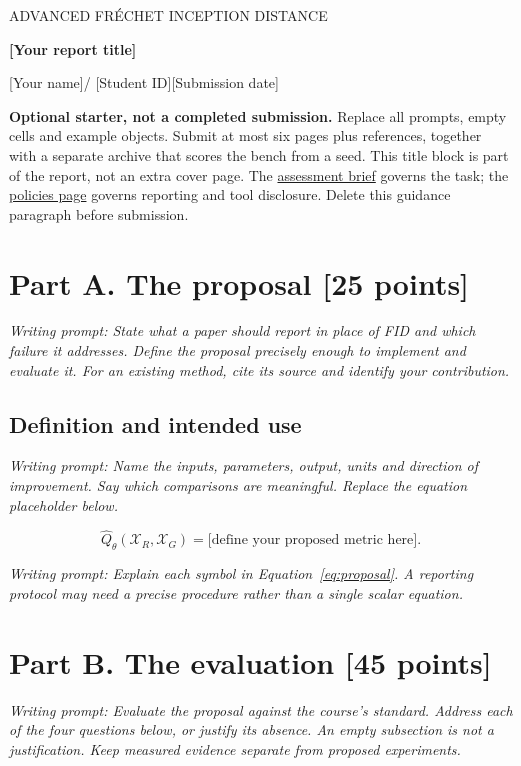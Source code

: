 \documentclass[11pt,a4paper]{article}
\newcommand{\reporttitle}{[Your report title]}
\newcommand{\studentname}{[Your name]}
\newcommand{\studentid}{[Student ID]}
\newcommand{\reportdate}{[Submission date]}
\newcommand{\courseurl}{https://comp4020-agentic-coding-studio.github.io/comp4020-ass2-jnheinrich451-eng}
\newcommand{\prompt}[1]{{\small\color{PromptGrey}\textit{Writing prompt: #1}\par}}
\begin{document}
{\small\sffamily\color{SlopGold}ADVANCED FR\'ECHET INCEPTION DISTANCE}

{\LARGE\sffamily\bfseries\reporttitle\par}
\vspace{8pt}
\studentname\enspace / \studentid\hfill\reportdate

{\small\textbf{Optional starter, not a completed submission.}
Replace all prompts, empty cells and example objects. Submit at most six pages
plus references, together with a separate archive that scores the bench from a
seed. This title block is part of the report, not an extra cover page.
The \href{\courseurl/assessments/final-report/}{assessment brief} governs the task;
the \href{\courseurl/policies/}{policies page} governs reporting and tool disclosure.
Delete this guidance paragraph before submission.}

\section{Part A. The proposal [25 points]}
\prompt{State what a paper should report in place of FID and which failure it
addresses. Define the proposal precisely enough to implement and evaluate it.
For an existing method, cite its source and identify your contribution.}

\subsection{Definition and intended use}
\prompt{Name the inputs, parameters, output, units and direction of improvement.
Say which comparisons are meaningful. Replace the equation placeholder below.}
\begin{equation}
  \widehat{Q}_{\theta}(\mathcal{X}_R,\mathcal{X}_G)
  = \text{[define your proposed metric here]}.
  \label{eq:proposal}
\end{equation}
\prompt{Explain each symbol in Equation~\ref{eq:proposal}. A reporting protocol
may need a precise procedure rather than a single scalar equation.}

\section{Part B. The evaluation [45 points]}
\prompt{Evaluate the proposal against the course's standard. Address each of the
four questions below, or justify its absence. An empty subsection is not a
justification. Keep measured evidence separate from proposed experiments.}
\end{document}
